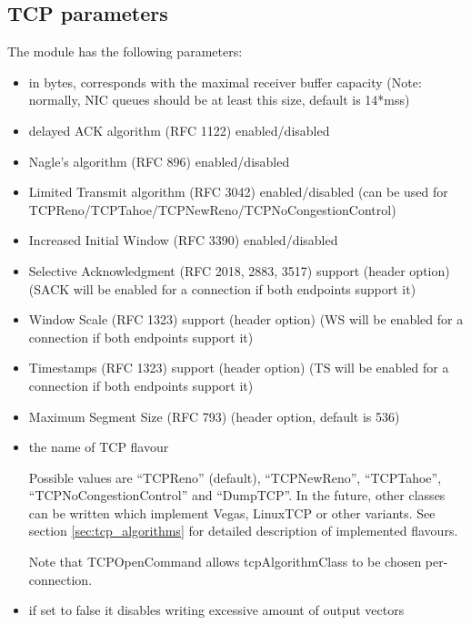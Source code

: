 
\subsection{TCP parameters}

The  module has the following parameters:
\begin{itemize}
  \item {} in bytes, corresponds with the maximal receiver buffer capacity (Note: normally, NIC queues should be at least this size, default is  14*mss)
  \item {} delayed ACK algorithm (RFC 1122) enabled/disabled
  \item {} Nagle's algorithm (RFC 896) enabled/disabled
  \item {} Limited Transmit algorithm (RFC 3042) enabled/disabled (can be used for TCPReno/TCPTahoe/TCPNewReno/TCPNoCongestionControl)
  \item {} Increased Initial Window (RFC 3390) enabled/disabled
  \item {} Selective Acknowledgment (RFC 2018, 2883, 3517) support (header option) (SACK will be enabled for a connection if both endpoints support it)
  \item {} Window Scale (RFC 1323) support (header option) (WS will be enabled for a connection if both endpoints support it)
  \item {} Timestamps (RFC 1323) support (header option) (TS will be enabled for a connection if both endpoints support it)
  \item {} Maximum Segment Size (RFC 793) (header option, default is 536)
  \item {} the name of TCP flavour
  
             Possible values are ``TCPReno'' (default), ``TCPNewReno'', ``TCPTahoe'', ``TCPNoCongestionControl'' and ``DumpTCP''.
             In the future, other classes can be written which implement Vegas, LinuxTCP  or other variants.
             See section \ref{sec:tcp_algorithms} for detailed description of implemented flavours.

             Note that TCPOpenCommand allows tcpAlgorithmClass to be chosen per-connection.

  \item {} if set to false it disables writing excessive amount of output vectors
\end{itemize}


